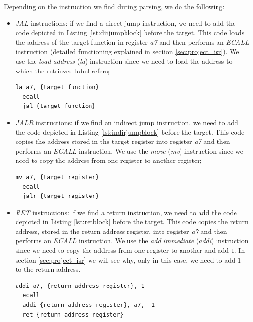 Depending on the instruction we find during parsing, we do the following:
\begin{itemize}
  \item \textit{JAL} instructions: if we find a direct jump instruction, we need
    to add the code depicted in Listing \ref{lst:dirjumpblock} before the target.
    This code loads the address of the target function in register \textit{a7}
    and then performs an \textit{ECALL} instruction (detailed functioning
    explained in section \ref{sec:project_isr}). We use the \textit{load address}
    (\textit{la}) instruction since we need to load the address to which the
    retrieved label refers; \begin{lstlisting}[style=Assembly, caption = Direct jump code block, label={lst:dirjumpblock}]
  la a7, {target_function}
  ecall
  jal {target_function}
    \end{lstlisting}

  \item \textit{JALR} instructions: if we find an indirect jump instruction, we
    need to add the code depicted in Listing \ref{lst:indirjumpblock} before the
    target. This code copies the address stored in the target register into register
    \textit{a7} and then performs an \textit{ECALL} instruction. We use the
    \textit{move} (\textit{mv}) instruction since we need to copy the address
    from one register to another register; \begin{lstlisting}[style=Assembly, caption = Indirect jump code block, label={lst:indirjumpblock}]
  mv a7, {target_register}
  ecall
  jalr {target_register}
    \end{lstlisting}

  \item \textit{RET} instructions: if we find a return instruction, we need to
    add the code depicted in Listing \ref{lst:retblock} before the target. This code
    copies the return address, stored in the return address register, into register
    \textit{a7} and then performs an \textit{ECALL} instruction. We use the
    \textit{add immediate} (\textit{addi}) instruction since we need to copy the
    address from one register to another and add $1$. In section \ref{sec:project_isr}
    we will see why, only in this case, we need to add $1$ to the return address.
    \begin{lstlisting}[style=Assembly, caption = Return code block, label={lst:retblock}]
  addi a7, {return_address_register}, 1
  ecall
  addi {return_address_register}, a7, -1
  ret {return_address_register}
    \end{lstlisting}
\end{itemize}

